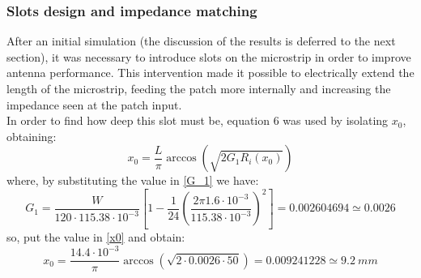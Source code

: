 \documentclass[]{article}
\begin{document}
 \subsubsection{Slots design and impedance matching}
 After an initial simulation (the discussion of the results is deferred to the next section), it was necessary to introduce slots on the microstrip in order to improve antenna performance. This intervention made it possible to electrically extend the length of the microstrip, feeding the patch more internally and increasing the impedance seen at the patch input.\\
 In order to find how deep this slot must be, equation 6 was used by isolating $x_0$, obtaining: 
 \begin{equation}
 	x_0 = \frac{L}{\pi} \arccos\left(\sqrt{2G_1 R_i(x_0)}\right)
 	\label{x0}
 \end{equation}
 where, by substituting the value in \eqref{G_1} we have:
 \[
 G_1=\frac{W}{120 \cdot 115.38 \cdot 10^{-3}
  }\left[ 1-\frac{1}{24}(\frac{2 \pi 1.6\cdot 10^{-3}}{ 115.38 \cdot 10^{-3}})^2\right] = 0.002604694 \simeq 0.0026  
 \]
 so, put the value in \eqref{x0} and obtain: 
 \[
 x_0 = \frac{14.4 \cdot 10^{-3}}{\pi} \arccos\left(\sqrt{2 \cdot 0.0026 \cdot  50}\right) =  0.009241228 \simeq 9.2 \ mm
 \]
\end{document}
